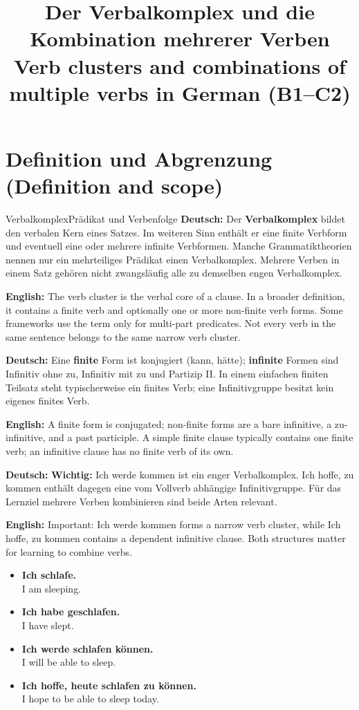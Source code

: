\documentclass[a4paper,11pt]{article}
\title{Der Verbalkomplex und die Kombination mehrerer Verben\\
 \large\textnormal{Verb clusters and combinations of multiple verbs in German (B1--C2)}}
\date{}
\newcommand{\GermanText}[1]{\textbf{Deutsch: }#1\par}
\newcommand{\EnglishText}[1]{{\small\color{SoftGray}\textbf{English: }#1\par}}
\newcommand{\ExampleItem}[2]{\item \textbf{#1}\\{\small\color{SoftGray}#2}}
\newcommand{\DEEN}[2]{\GermanText{#1}\EnglishText{#2}}
\newcommand{\Pair}[2]{\ExampleItem{#1}{#2}}
\begin{document}
\maketitle\tableofcontents\newpage

\section{Definition und Abgrenzung \textnormal{(Definition and scope)}}
\begin{grammarentry}{Verbalkomplex}{Prädikat und Verbenfolge}
\DEEN{Der \textbf{Verbalkomplex} bildet den verbalen Kern eines Satzes. Im weiteren Sinn enthält er eine finite Verbform und eventuell eine oder mehrere infinite Verbformen. Manche Grammatiktheorien nennen nur ein mehrteiliges Prädikat einen Verbalkomplex. Mehrere Verben in einem Satz gehören nicht zwangsläufig alle zu demselben engen Verbalkomplex.}{The verb cluster is the verbal core of a clause. In a broader definition, it contains a finite verb and optionally one or more non-finite verb forms. Some frameworks use the term only for multi-part predicates. Not every verb in the same sentence belongs to the same narrow verb cluster.}
\DEEN{Eine \textbf{finite} Form ist konjugiert (\glqq kann\grqq, \glqq hätte\grqq); \textbf{infinite} Formen sind Infinitiv ohne zu, Infinitiv mit zu und Partizip II. In einem einfachen finiten Teilsatz steht typischerweise ein finites Verb; eine Infinitivgruppe besitzt kein eigenes finites Verb.}{A finite form is conjugated; non-finite forms are a bare infinitive, a zu-infinitive, and a past participle. A simple finite clause typically contains one finite verb; an infinitive clause has no finite verb of its own.}
\DEEN{\textbf{Wichtig:} \glqq Ich werde kommen\grqq{} ist ein enger Verbalkomplex. \glqq Ich hoffe, zu kommen\grqq{} enthält dagegen eine vom Vollverb abhängige Infinitivgruppe. Für das Lernziel \glqq mehrere Verben kombinieren\grqq{} sind beide Arten relevant.}{Important: Ich werde kommen forms a narrow verb cluster, while Ich hoffe, zu kommen contains a dependent infinitive clause. Both structures matter for learning to combine verbs.}
\end{grammarentry}
\begin{exbox}\begin{itemize}
\Pair{Ich schlafe.}{I am sleeping.}
\Pair{Ich habe geschlafen.}{I have slept.}
\Pair{Ich werde schlafen können.}{I will be able to sleep.}
\Pair{Ich hoffe, heute schlafen zu können.}{I hope to be able to sleep today.}
\end{itemize}\end{exbox}
\end{document}
